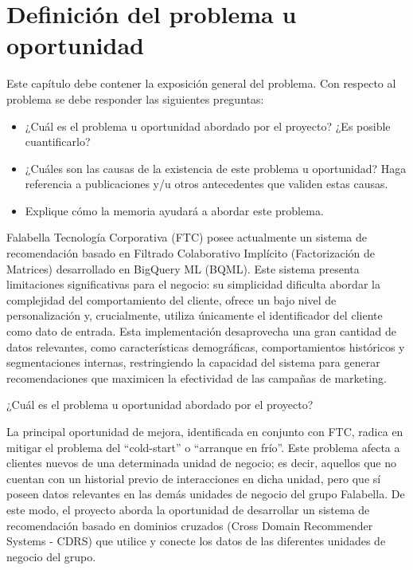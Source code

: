 \chapter{Definición del problema u oportunidad} %
\label{sec:problema} %

Este capítulo debe contener la exposición general del problema. Con respecto al problema se debe responder las siguientes preguntas:
\begin{itemize}
	\item	¿Cuál es el problema u oportunidad abordado por el proyecto? ¿Es posible cuantificarlo?
	\item	¿Cuáles son las causas de la existencia de este problema u oportunidad? Haga referencia a publicaciones y/u otros antecedentes que validen estas causas.
	\item Explique cómo la memoria ayudará a abordar este problema.
	
\end{itemize}

\newpage

Falabella Tecnología Corporativa (FTC) posee actualmente un sistema de recomendación basado en Filtrado Colaborativo Implícito (Factorización de Matrices) desarrollado en BigQuery ML (BQML). Este sistema presenta limitaciones significativas para el negocio: su simplicidad dificulta abordar la complejidad del comportamiento del cliente, ofrece un bajo nivel de personalización y, crucialmente, utiliza únicamente el identificador del cliente como dato de entrada. Esta implementación desaprovecha una gran cantidad de datos relevantes, como características demográficas, comportamientos históricos y segmentaciones internas, restringiendo la capacidad del sistema para generar recomendaciones que maximicen la efectividad de las campañas de marketing.

¿Cuál es el problema u oportunidad abordado por el proyecto?

La principal oportunidad de mejora, identificada en conjunto con FTC, radica en mitigar el problema del \enquote{cold-start} o \enquote{arranque en frío}. Este problema afecta a clientes nuevos de una determinada unidad de negocio; es decir, aquellos que no cuentan con un historial previo de interacciones en dicha unidad, pero que sí poseen datos relevantes en las demás unidades de negocio del grupo Falabella. De este modo, el proyecto aborda la oportunidad de desarrollar un sistema de recomendación basado en dominios cruzados (Cross Domain Recommender Systems - CDRS) que utilice y conecte los datos de las diferentes unidades de negocio del grupo.

